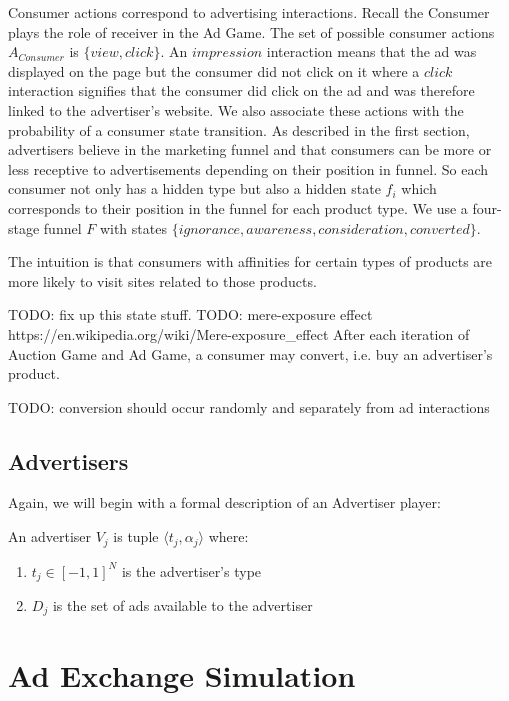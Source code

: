 \documentclass{article}
\begin{document}
Consumer actions correspond to advertising interactions. Recall the Consumer plays the role of receiver in the Ad Game. The set of possible consumer actions $A_{Consumer}$ is $\{view, click\}$. An $impression$ interaction means that the ad was displayed on the page but the consumer did not click on it where a $click$ interaction signifies that the consumer did click on the ad and was therefore linked to the advertiser's website. We also associate these actions with the probability of a consumer state transition. As described in the first section, advertisers believe in the marketing funnel and that consumers can be more or less receptive to advertisements depending on their position in funnel. So each consumer not only has a hidden type but also a hidden state $f_i$ which corresponds to their position in the funnel for each product type. We use a four-stage funnel $F$ with states $\{ignorance, awareness, consideration, converted\}$. 

The intuition is that consumers with affinities for certain types of products are more likely to visit sites related to those products.

TODO: fix up this state stuff.
TODO: mere-exposure effect https://en.wikipedia.org/wiki/Mere-exposure\_effect
After each iteration of Auction Game and Ad Game, a consumer may convert, i.e. buy an advertiser's product.

TODO: conversion should occur randomly and separately from ad interactions

\subsection{Advertisers}

Again, we will begin with a formal description of an Advertiser player:

An advertiser $V_j$ is tuple $\langle t_j, \alpha_j \rangle$ where:

\begin{enumerate}
	\item $t_j \in [-1,1]^N$ is the advertiser's type
	\item $D_j$ is the set of ads available to the advertiser
\end{enumerate}

\newpage

\section{Ad Exchange Simulation}
\end{document}

